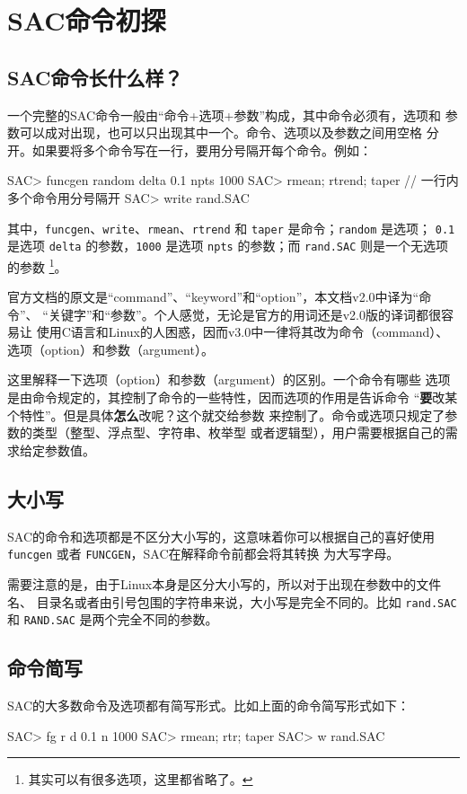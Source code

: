 \section{SAC命令初探}
\subsection{SAC命令长什么样？}
一个完整的SAC命令一般由``命令+选项+参数''构成，其中命令必须有，选项和
参数可以成对出现，也可以只出现其中一个。命令、选项以及参数之间用空格
分开。如果要将多个命令写在一行，要用分号隔开每个命令。例如：
\begin{SACCode}
SAC> funcgen random delta 0.1 npts 1000
SAC> rmean; rtrend; taper                 // 一行内多个命令用分号隔开
SAC> write rand.SAC
\end{SACCode}
其中，\texttt{funcgen}、\texttt{write}、\texttt{rmean}、\texttt{rtrend}
和 \texttt{taper} 是命令；\texttt{random} 是选项；
\texttt{0.1} 是选项 \texttt{delta} 的参数，\texttt{1000} 是选项
\texttt{npts} 的参数；而 \texttt{rand.SAC} 则是一个无选项的参数
\footnote{其实可以有很多选项，这里都省略了。}。

\begin{note}
官方文档的原文是“command”、“keyword”和“option”，本文档v2.0中译为“命令”、
“关键字”和“参数”。个人感觉，无论是官方的用词还是v2.0版的译词都很容易让
使用C语言和Linux的人困惑，因而v3.0中一律将其改为命令（command）、
选项（option）和参数（argument）。

这里解释一下选项（option）和参数（argument）的区别。一个命令有哪些
选项是由命令规定的，其控制了命令的一些特性，因而选项的作用是告诉命令
“\textbf{要}改某个特性”。但是具体\textbf{怎么}改呢？这个就交给参数
来控制了。命令或选项只规定了参数的类型（整型、浮点型、字符串、枚举型
或者逻辑型），用户需要根据自己的需求给定参数值。
\end{note}

\subsection{大小写}
SAC的命令和选项都是不区分大小写的，这意味着你可以根据自己的喜好使用
\texttt{funcgen} 或者 \texttt{FUNCGEN}，SAC在解释命令前都会将其转换
为大写字母。

需要注意的是，由于Linux本身是区分大小写的，所以对于出现在参数中的文件名、
目录名或者由引号包围的字符串来说，大小写是完全不同的。比如 \texttt{rand.SAC}
和 \texttt{RAND.SAC} 是两个完全不同的参数。

\subsection{命令简写}
SAC的大多数命令及选项都有简写形式。比如上面的命令简写形式如下：
\begin{SACCode}
SAC> fg r d 0.1 n 1000
SAC> rmean; rtr; taper
SAC> w rand.SAC
\end{SACCode}

